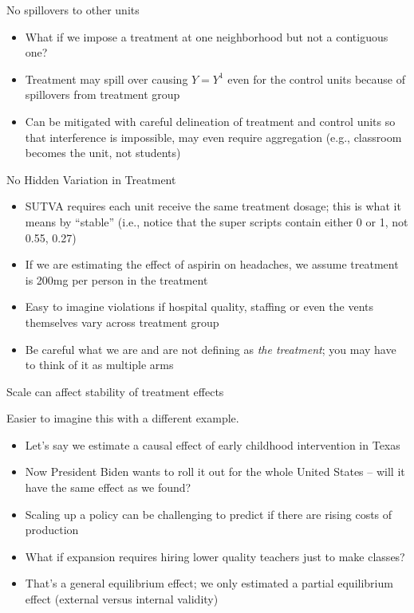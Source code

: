 \documentclass{beamer}
\begin{document}
\begin{frame}{No spillovers to other units}

  \begin{itemize}
    \item What if we impose a treatment at one neighborhood but not a contiguous one?
    \item Treatment may spill over causing $Y=Y^1$ even for the control units because of spillovers from treatment group
    \item Can be mitigated with careful delineation of treatment and control units so that interference is impossible, may even require aggregation (e.g., classroom becomes the unit, not students)
  \end{itemize}
\end{frame}



\begin{frame}{No Hidden Variation in Treatment}

  \begin{itemize}
    \item SUTVA requires each unit receive the same treatment dosage; this is what it means by ``stable'' (i.e., notice that the super scripts contain either 0 or 1, not 0.55, 0.27)
    \item If we are estimating the effect of aspirin on headaches, we assume treatment is 200mg per person in the treatment
    \item Easy to imagine violations if hospital quality, staffing or even the vents themselves vary across treatment group
    \item Be careful what we are and are not defining as \emph{the treatment}; you may have to think of it as multiple arms
  \end{itemize}
\end{frame}

\begin{frame}{Scale can affect stability of treatment effects}

  Easier to imagine this with a different example.
  \begin{itemize}
    \item Let's say we estimate a causal effect of early childhood intervention in Texas
    \item Now President Biden wants to roll it out for the whole United States -- will it have the same effect as we found?
    \item Scaling up a policy can be challenging to predict if there are rising costs of production
    \item What if expansion requires hiring lower quality teachers just to make classes?
    \item That's a general equilibrium effect; we only estimated a partial equilibrium effect (external versus internal validity)
  \end{itemize}
\end{frame}
\end{document}
